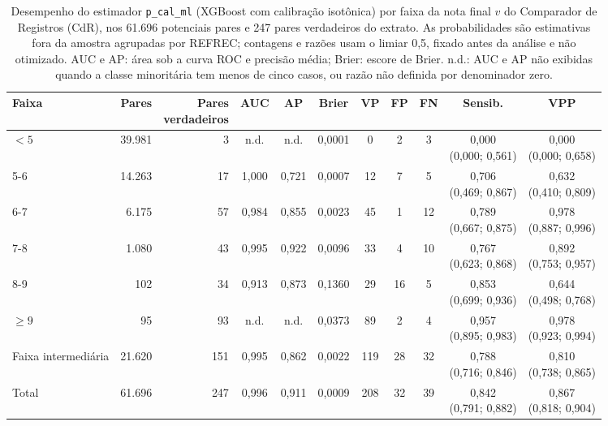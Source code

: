 \begin{table}[!htbp]
\centering
\scriptsize
\setlength{\tabcolsep}{3pt}
\caption{Desempenho do estimador \texttt{p\_cal\_ml} (XGBoost com calibração isotônica) por faixa da nota final $v$ do Comparador de Registros (CdR), nos 61.696 potenciais pares e 247 pares verdadeiros do extrato. As probabilidades são estimativas fora da amostra agrupadas por REFREC; contagens e razões usam o limiar 0,5, fixado antes da análise e não otimizado. AUC e AP: área sob a curva ROC e precisão média; Brier: escore de Brier. n.d.: AUC e AP não exibidas quando a classe minoritária tem menos de cinco casos, ou razão não definida por denominador zero.}
\label{tab:e4-desempenho-faixas-oof}
\begin{tabular}{@{}lrrcccccccc@{}}
\toprule
Faixa & Pares & \shortstack{Pares\\verdadeiros} & AUC & AP & Brier & VP & FP & FN & Sensib. & VPP \\
\midrule
$<5$ & 39.981 & 3 & n.d. & n.d. & 0,0001 & 0 & 2 & 3 & \shortstack{0,000\\(0,000; 0,561)} & \shortstack{0,000\\(0,000; 0,658)} \\
5-6 & 14.263 & 17 & 1,000 & 0,721 & 0,0007 & 12 & 7 & 5 & \shortstack{0,706\\(0,469; 0,867)} & \shortstack{0,632\\(0,410; 0,809)} \\
6-7 & 6.175 & 57 & 0,984 & 0,855 & 0,0023 & 45 & 1 & 12 & \shortstack{0,789\\(0,667; 0,875)} & \shortstack{0,978\\(0,887; 0,996)} \\
7-8 & 1.080 & 43 & 0,995 & 0,922 & 0,0096 & 33 & 4 & 10 & \shortstack{0,767\\(0,623; 0,868)} & \shortstack{0,892\\(0,753; 0,957)} \\
8-9 & 102 & 34 & 0,913 & 0,873 & 0,1360 & 29 & 16 & 5 & \shortstack{0,853\\(0,699; 0,936)} & \shortstack{0,644\\(0,498; 0,768)} \\
$\geq9$ & 95 & 93 & n.d. & n.d. & 0,0373 & 89 & 2 & 4 & \shortstack{0,957\\(0,895; 0,983)} & \shortstack{0,978\\(0,923; 0,994)} \\
\midrule
Faixa intermediária & 21.620 & 151 & 0,995 & 0,862 & 0,0022 & 119 & 28 & 32 & \shortstack{0,788\\(0,716; 0,846)} & \shortstack{0,810\\(0,738; 0,865)} \\
Total & 61.696 & 247 & 0,996 & 0,911 & 0,0009 & 208 & 32 & 39 & \shortstack{0,842\\(0,791; 0,882)} & \shortstack{0,867\\(0,818; 0,904)} \\
\bottomrule
\end{tabular}


\end{table}
